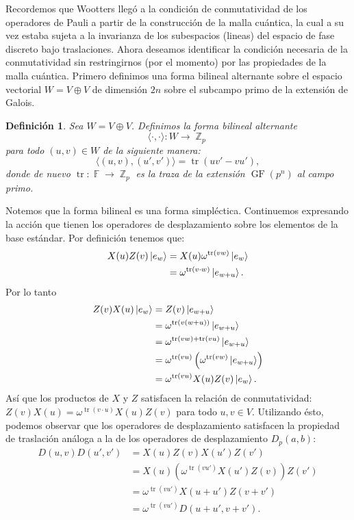 \documentclass[a4paper]{report}
\DeclareMathOperator{\Z}{\mathbb{Z}}
\DeclareMathOperator{\F}{\mathbb{F}}
\DeclareMathOperator{\tr}{tr}
\DeclareMathOperator{\GF}{GF}
\newtheorem{definition}{Definición}
\begin{document}
  Recordemos que Wootters llegó a la condición de
  conmutatividad de los operadores de Pauli a partir de la
  construcción de la malla cuántica, la cual a su vez estaba
  sujeta a la invarianza de los subespacios (lineas) del
  espacio de fase discreto bajo traslaciones. Ahora deseamos
  identificar la condición necesaria de la conmutatividad
  sin restringirnos (por el momento) por las propiedades de
  la malla cuántica. Primero definimos una forma bilineal
  alternante sobre el espacio vectorial $W = V \oplus V$ de
  dimensión $2n$ sobre el subcampo primo de la extensión de
  Galois. 
  \begin{definition}
    Sea $W = V \oplus V$. Definimos la forma bilineal
    alternante 
    \[
      \langle \cdot, \cdot \rangle : W \to \Z_p
    \]
    para todo $(u,v) \in W$ de la siguiente manera:
    \begin{equation}
      \label{eqn:bilinear_form}
      \langle (u,v), (u',v') \rangle
      = \tr\left( u v' - v u' \right),
    \end{equation}
    donde de nuevo $\tr : \F \to \Z_p$ es la traza de la
    extensión $\GF(p^{n})$ al campo primo. 
  \end{definition}
  Notemos que la forma bilineal es una forma simpléctica.
  Continuemos expresando la acción que tienen los operadores
  de desplazamiento sobre los elementos de la base estándar.
  Por definición tenemos que:
  \begin{align}
    X(u)Z(v) \ket{e_w}
    &= X(u) \omega^{\tr(v w)} \ket{e_w} \\
    &= \omega^{\tr(v \cdot w)} \ket{e_{w+u}}.
  \end{align}
  Por lo tanto
  \begin{align}
    Z(v)X(u) \ket{e_w}
    &= Z(v) \ket{e_{w+u}} \\
    &= \omega^{\tr(v (w+u))} \ket{e_{w+u}} \\
    &= \omega^{\tr(v w) + \tr(v u)}
    \ket{e_{w+u}} \\
    &= \omega^{\tr(v u)} \left( \omega^{\tr(v
    w)} \ket{e_{w+u}} \right) \\
    &= \omega^{\tr(v u)} X(u)Z(v) \ket{e_{w}}.
  \end{align}
  Así que los productos de $X$ y $Z$ satisfacen la relación
  de conmutatividad: $Z(v)X(u) = \omega^{\tr(v \cdot u)}
  X(u)Z(v)$ para todo $u,v \in V$. Utilizando ésto, podemos
  observar que los operadores de desplazamiento satisfacen
  la propiedad de traslación análoga a la de los operadores
  de desplazamiento $D_p(a,b)$:
  \begin{align}
    D(u,v) D(u',v')
    &= X(u)Z(v) X(u')Z(v') \\
    &= X(u) \left( \omega^{\tr(v u')} X(u') Z(v)
    \right) Z(v') \\
    &= \omega^{\tr(v u')} X(u+u') Z(v + v') \\
    &= \omega^{\tr(v u')} D(u+u',v+v')
    \label{eqn:disp_product_relation}.
  \end{align}
\end{document}
